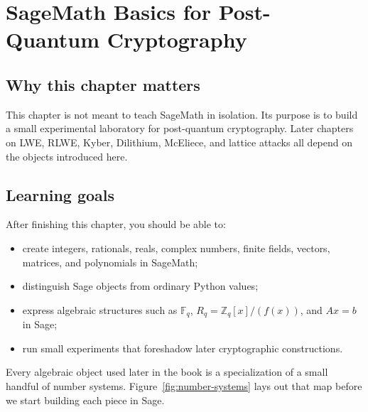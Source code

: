 \chapter{SageMath Basics for Post-Quantum Cryptography}
\label{ch:sagemath}

\section{Why this chapter matters}
This chapter is not meant to teach SageMath in isolation. Its purpose is to build a small experimental laboratory for post-quantum cryptography. Later chapters on LWE, RLWE, Kyber, Dilithium, McEliece, and lattice attacks all depend on the objects introduced here.

\section{Learning goals}
After finishing this chapter, you should be able to:

\begin{itemize}
  \item create integers, rationals, reals, complex numbers, finite fields, vectors, matrices, and polynomials in SageMath;
  \item distinguish Sage objects from ordinary Python values;
  \item express algebraic structures such as $\mathbb{F}_q$, $R_q = \mathbb{Z}_q[x]/(f(x))$, and $Ax=b$ in Sage;
  \item run small experiments that foreshadow later cryptographic constructions.
\end{itemize}

Every algebraic object used later in the book is a specialization of a small handful of number systems. Figure~\ref{fig:number-systems} lays out that map before we start building each piece in Sage.

